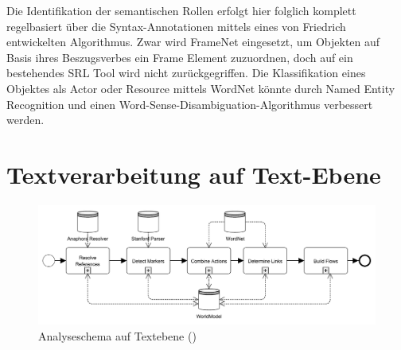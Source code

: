 \par
Die Identifikation der semantischen Rollen erfolgt hier folglich komplett regelbasiert über die Syntax-Annotationen mittels eines von Friedrich entwickelten Algorithmus. Zwar wird FrameNet eingesetzt, um Objekten auf Basis ihres Beszugsverbes ein Frame Element zuzuordnen, doch auf ein bestehendes \ac{SRL} Tool wird nicht zurückgegriffen. Die Klassifikation eines Objektes als Actor oder Resource mittels WordNet könnte durch Named Entity Recognition und einen Word-Sense-Disambiguation-Algorithmus verbessert werden.

\section{Textverarbeitung auf Text-Ebene}
\label{subsec:TextLevel}

\begin{figure}[H]
\begin{center}
\includegraphics[keepaspectratio=true, width=\textwidth]{pictures/textLevel.png}
\caption{Analyseschema auf Textebene (\cite[vgl.][7]{FRIEDRICH2})}
\label{fig:TLEVEL}
\end{center}\end{figure}


